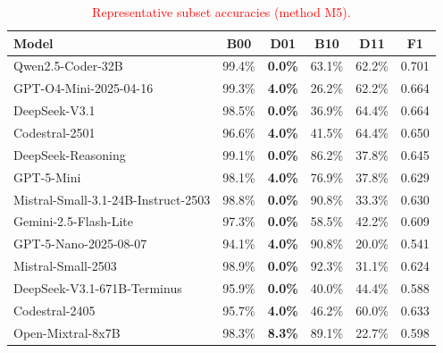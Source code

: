 \documentclass[authoryear,final,5p,times,twocolumn]{elsarticle}
\theoremstyle{plain}
\begin{document}
\begin{table}[!htbp]
\centering
\caption{\textcolor{red}{Representative subset accuracies (method M5).} 
}
\label{tab:m5_subsets}
\scriptsize
\setlength{\tabcolsep}{5pt}
\renewcommand{\arraystretch}{1.2}
\begin{tabular}{@{}l c >{\columncolor{red!20}}c >{\columncolor{gray!20}}c >{\columncolor{gray!20}}c c@{}}

\toprule
Model & B00 & D01 & B10 & D11 & F1 \\
\midrule

Qwen2.5-Coder-32B 
& 99.4\% & \textbf{0.0\%} & 63.1\% & 62.2\% & {0.701} \\

GPT-O4-Mini-2025-04-16 
& 99.3\% & \textbf{4.0\%} & 26.2\% & 62.2\% & {0.664} \\

DeepSeek-V3.1 
& 98.5\% & \textbf{0.0\%} & 36.9\% & 64.4\% & {0.664} \\

Codestral-2501 
& 96.6\% & \textbf{4.0\%} & 41.5\% & 64.4\% & {0.650} \\

DeepSeek-Reasoning 
& 99.1\% & \textbf{0.0\%} & 86.2\% & 37.8\% & {0.645} \\

GPT-5-Mini 
& 98.1\% & \textbf{4.0\%} & 76.9\% & 37.8\% & {0.629} \\

Mistral-Small-3.1-24B-Instruct-2503 
& 98.8\% & \textbf{0.0\%} & 90.8\% & 33.3\% & {0.630} \\

Gemini-2.5-Flash-Lite 
& 97.3\% & \textbf{0.0\%} & 58.5\% & 42.2\% & {0.609} \\

GPT-5-Nano-2025-08-07 
& 94.1\% & \textbf{4.0\%} & 90.8\% & 20.0\% & {0.541} \\

Mistral-Small-2503 
& 98.9\% & \textbf{0.0\%} & 92.3\% & 31.1\% & {0.624} \\

DeepSeek-V3.1-671B-Terminus 
& 95.9\% & \textbf{0.0\%} & 40.0\% & 44.4\% & {0.588} \\

Codestral-2405 
& 95.7\% & \textbf{4.0\%} & 46.2\% & 60.0\% & {0.633} \\

Open-Mixtral-8x7B 
& 98.3\% & \textbf{8.3\%} & 89.1\% & 22.7\% & {0.598} \\

\bottomrule
\end{tabular}
\end{table}
\end{document}
